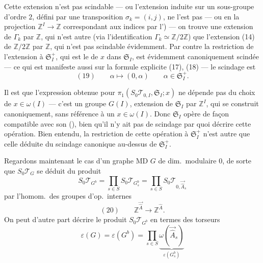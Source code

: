 \documentclass[11pt,a4paper]{article}
\begin{document}
Cette extension n'est pas scindable --- ou l'extension induite sur un sous-groupe  d'ordre $2$, défini par une transposition $\sigma_k = (i,j)$, ne l'est pas --- ou en  la projection $\mathbb{Z}^I \to \mathbb{Z}$ correspondant aux \ill{} indices \ill{} \ill{} par l') --- on trouve une extension de $\Gamma_k$ par $\mathbb{Z}$, qui n'est autre (via l'identification $\Gamma_k \simeq \mathbb{Z}/2\mathbb{Z}$) que l'extension (14) de $\mathbb{Z}/2\mathbb{Z}$ par $\mathbb{Z}$, qui n'est pas scindable évidemment. Par contre la restriction de l'extension à $\mathfrak{S}_I^+$, qui est le  de $x$ dans $\mathfrak{S}_I$, est évidemment canoniquement scindée --- ce qui est manifeste aussi sur la formule explicite (17), (18) --- le scindage est
\[
  (19) \qquad \alpha \longmapsto (0, \alpha) \qquad \alpha \in \mathfrak{S}_I^+ .
\]

Il est  que l'expression obtenue pour $\pi_1(S_0\mathcal{T}_{0,I}, \mathfrak{S}_I; x)$ ne dépende pas du choix de $x \in \omega(I)$ --- c'est un groupe $G(I)$, extension de $\mathfrak{S}_I$ par $\mathbb{Z}^I$, qui se construit canoniquement, sans référence à un $x \in \omega(I)$. Donc $\mathfrak{S}_I$ opère \ill{} de façon compatible avec son \ill{} (\ill{}), bien qu'il n'y ait pas de scindage par quoi décrire cette opération. Bien entendu, la restriction de cette opération à $\mathfrak{S}_I^+$ n'est autre que celle déduite du scindage canonique au-dessus de $\mathfrak{S}_I^+$.

Regardons maintenant le cas d'un graphe MD $G$ de dim.\ modulaire $0$, de sorte que $S_0\mathcal{T}_G$ se déduit du produit
\[
  S_0\mathcal{T}_{G^b} = \prod_{s\in S} S_0\mathcal{T}_{G^b_s} = \prod_{s\in S} S_0\mathcal{T}_{0,\vec{\hat A}_s}
\]
par l'homom.\ des groupes \struck{\ill{}} d'op.\ internes
\[
  (20) \qquad \mathbb{Z}^{\vec{\hat A}} \longrightarrow \mathbb{Z}^{\hat A} .
\]
On peut d'autre part décrire le produit $S_0\mathcal{T}_{G^b}$ en termes des torseurs
\[
  \varepsilon(G) = \varepsilon(G^b) = \prod_{s\in S} \underbrace{\omega(\vec{\hat A}_s)}_{\varepsilon(G^b_s)}
\]
\end{document}

